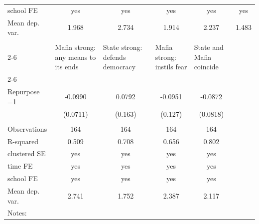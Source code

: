 \documentclass[12pt]{article}
\theoremstyle{plain}
\theoremstyle{plain}
\theoremstyle{plain}
\theoremstyle{definition}
\theoremstyle{plain}
\theoremstyle{definition}
\theoremstyle{plain}
\theoremstyle{remark}
\theoremstyle{definition}
\theoremstyle{definition}
\theoremstyle{plain}
\begin{document}
\begin{table}[H]
{\begin{tabular}{p{7.39em}lllll}
	\multicolumn{1}{l}{school FE} & \multicolumn{1}{c}{yes} & \multicolumn{1}{c}{yes} & \multicolumn{1}{c}{yes} & \multicolumn{1}{c}{yes} & \multicolumn{1}{c}{yes} \\
	\multicolumn{1}{l}{Mean dep. var.} & \multicolumn{1}{c}{1.968} & \multicolumn{1}{c}{2.734} & \multicolumn{1}{c}{1.914} & \multicolumn{1}{c}{2.237} & \multicolumn{1}{c}{1.483} \\
	\midrule
	\multicolumn{1}{r}{} &       &       &       &       &  \\
	\cmidrule{2-6}    \multicolumn{1}{l}{\textit{Dep. Variable}} & \multicolumn{1}{p{10em}}{Mafia strong: any means to its ends} & \multicolumn{1}{p{9.78em}}{State strong: defends democracy} & \multicolumn{1}{p{8.055em}}{Mafia strong: instils fear} & \multicolumn{1}{p{8.665em}}{State and Mafia coincide} &  \\
	\cmidrule{2-6}    \multicolumn{1}{r}{} &       &       &       &       &  \\
	\multicolumn{1}{l}{Repurpose =1  } & \multicolumn{1}{c}{-0.0990} & \multicolumn{1}{c}{0.0792} & \multicolumn{1}{c}{-0.0951} & \multicolumn{1}{c}{-0.0872} &  \\
	\multicolumn{1}{r}{} & \multicolumn{1}{c}{(0.0711)} & \multicolumn{1}{c}{(0.163)} & \multicolumn{1}{c}{(0.127)} & \multicolumn{1}{c}{(0.0818)} &  \\
	\multicolumn{1}{r}{} &       &       &       &       &  \\
	\multicolumn{1}{l}{Observations} & \multicolumn{1}{c}{164} & \multicolumn{1}{c}{164} & \multicolumn{1}{c}{164} & \multicolumn{1}{c}{164} &  \\
	\multicolumn{1}{l}{R-squared} & \multicolumn{1}{c}{0.509} & \multicolumn{1}{c}{0.708} & \multicolumn{1}{c}{0.656} & \multicolumn{1}{c}{0.802} &  \\
	\multicolumn{1}{l}{clustered SE} & \multicolumn{1}{c}{yes} & \multicolumn{1}{c}{yes} & \multicolumn{1}{c}{yes} & \multicolumn{1}{c}{yes} &  \\
	\multicolumn{1}{l}{time FE} & \multicolumn{1}{c}{yes} & \multicolumn{1}{c}{yes} & \multicolumn{1}{c}{yes} & \multicolumn{1}{c}{yes} &  \\
	\multicolumn{1}{l}{school FE} & \multicolumn{1}{c}{yes} & \multicolumn{1}{c}{yes} & \multicolumn{1}{c}{yes} & \multicolumn{1}{c}{yes} &  \\
	\multicolumn{1}{l}{Mean dep. var.} & \multicolumn{1}{c}{2.741} & \multicolumn{1}{c}{1.752} & \multicolumn{1}{c}{2.387} & \multicolumn{1}{c}{2.117} &  \\
	\midrule
	\multicolumn{6}{p{50.055em}}{Notes:} \\
\end{tabular}%
}
\end{table}
\end{document}
